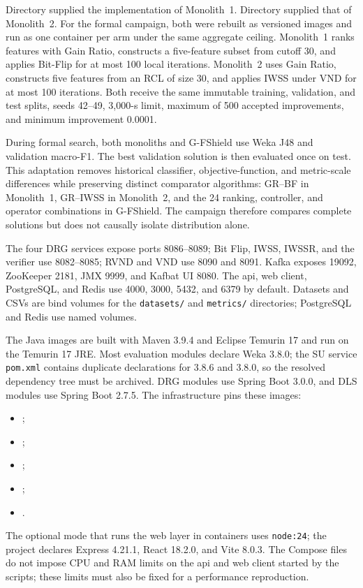 Directory  supplied the implementation of Monolith~1. Directory  supplied that of Monolith~2. For the formal campaign, both were rebuilt as versioned images and run as one container per arm under the same aggregate ceiling. Monolith~1 ranks features with Gain Ratio, constructs a five-feature subset from cutoff 30, and applies Bit-Flip for at most 100 local iterations. Monolith~2 uses Gain Ratio, constructs five features from an RCL of size 30, and applies IWSS under VND for at most 100 iterations. Both receive the same immutable training, validation, and test splits, seeds 42--49, 3,000-s limit, maximum of 500 accepted improvements, and minimum improvement 0.0001.

During formal search, both monoliths and G-FShield use Weka J48 and validation macro-F1. The best validation solution is then evaluated once on test. This adaptation removes historical classifier, objective-function, and metric-scale differences while preserving distinct comparator algorithms: GR--BF in Monolith~1, GR--IWSS in Monolith~2, and the 24 ranking, controller, and operator combinations in G-FShield. The campaign therefore compares complete solutions but does not causally isolate distribution alone.

The four DRG services expose ports 8086--8089; Bit Flip, IWSS, IWSSR, and the verifier use 8082--8085; RVND and VND use 8090 and 8091. Kafka exposes 19092, ZooKeeper 2181, JMX 9999, and Kafbat UI 8080. The \ac{api}, web client, PostgreSQL, and Redis use 4000, 3000, 5432, and 6379 by default. Datasets and CSVs are bind volumes for the \texttt{datasets/} and \texttt{metrics/} directories; PostgreSQL and Redis use named volumes.

The Java images are built with Maven 3.9.4 and Eclipse Temurin 17 and run on the Temurin 17 JRE. Most evaluation modules declare Weka 3.8.0; the SU service \texttt{pom.xml} contains duplicate declarations for 3.8.6 and 3.8.0, so the resolved dependency tree must be archived. DRG modules use Spring Boot 3.0.0, and DLS modules use Spring Boot 2.7.5. The infrastructure pins these images:
\begin{itemize}
  \item {};
  \item {};
  \item {};
  \item {};
  \item {}.
\end{itemize}
The optional mode that runs the web layer in containers uses \texttt{node:24}; the project declares Express 4.21.1, React 18.2.0, and Vite 8.0.3. The Compose files do not impose CPU and RAM limits on the \ac{api} and web client started by the scripts; these limits must also be fixed for a performance reproduction.

